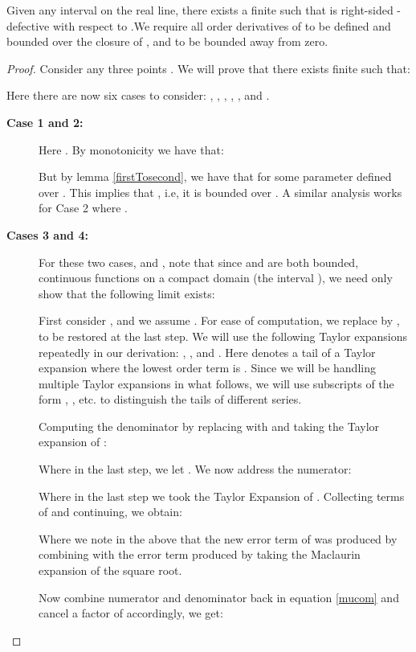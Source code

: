 \documentclass[11pt]{myclass}
\begin{document}
\begin{lemma}\label{app:2}
Given any interval  on the real line, there exists a finite  such that   is right-sided -defective with respect to .We require all order derivatives of  to be defined and bounded over the closure of ,
and  to be bounded away from zero. 
\end{lemma}

\begin{proof}
Consider any three points . We will prove that there exists finite  such that:



 Here there are now six cases to consider: , , , , , and  .

\begin{description}
\item[\textbf{Case 1 and 2:}]
Here .  By monotonicity we have that:


But by lemma \ref{firstTosecond}, we have that  for some parameter  defined over .
This implies that , i.e, it is bounded over . A similar analysis works for Case 2 where .

\item[\textbf{Cases 3 and 4:}]
For these two cases,  and , note that since  and  are both bounded, continuous functions on a compact domain (the interval ), we need only show that the following limit exists:


First consider , and we assume .  For ease of computation, we replace  by , to be restored 
at the last step. We will use the following Taylor expansions repeatedly in our derivation: , ,  and .  Here  denotes a tail of a Taylor expansion where the lowest order term is . Since we will be handling
multiple Taylor expansions in what follows, we will use subscripts of the form , , etc. to distinguish the tails
of different series.  


Computing the denominator by replacing  with  and taking the Taylor expansion of :

Where in the last step, we let .
We now address the numerator:

Where in the last step we took the Taylor Expansion of . Collecting terms of  and continuing, we obtain:

Where we note in the above that the new error term of  was produced by combining  with the error term
produced by taking the Maclaurin expansion of the square root.


Now combine numerator and denominator back in equation \ref{mucom} and cancel a factor of  accordingly, we get:



\end{description}
\end{proof}
\end{document}
